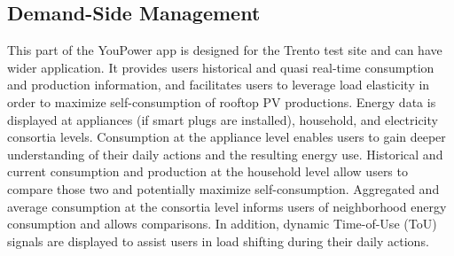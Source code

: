 %


\subsection{Demand-Side Management} 
\label{sect:load_shifting}

This part of the YouPower app is designed for the Trento test site and can have wider application.
It provides users historical and quasi real-time consumption and production information, and facilitates users to leverage load elasticity in order to maximize self-consumption of rooftop PV productions. 
Energy data is displayed at appliances (if smart plugs are installed), household, and electricity consortia levels. %
%
Consumption at the appliance level enables users to gain deeper understanding of their daily actions and the resulting energy use. 
% 
Historical and current consumption and production at the household level allow users to compare those two and potentially maximize self-consumption. 
% 
Aggregated and average consumption at the consortia level informs users of neighborhood energy consumption and allows comparisons.  
% 
In addition, dynamic Time-of-Use (ToU) signals are displayed  to assist users in load shifting during their daily actions. 


